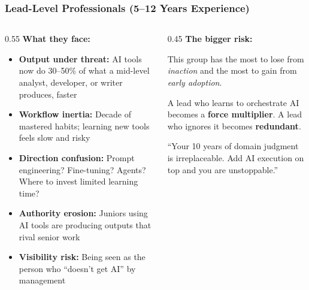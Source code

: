 \begin{frame}[fragile]\frametitle{Lead-Level Professionals (5--12 Years Experience)}

\begin{columns}
    \begin{column}[T]{0.55\linewidth}
\textbf{What they face:}
\begin{itemize}
\item \textbf{Output under threat:} AI tools now do 30--50\% of what a mid-level analyst, developer, or writer produces, faster
\item \textbf{Workflow inertia:} Decade of mastered habits; learning new tools feels slow and risky
\item \textbf{Direction confusion:} Prompt engineering? Fine-tuning? Agents? Where to invest limited learning time?
\item \textbf{Authority erosion:} Juniors using AI tools are producing outputs that rival senior work
\item \textbf{Visibility risk:} Being seen as the person who ``doesn't get AI'' by management
\end{itemize}
    \end{column}
    \begin{column}[T]{0.45\linewidth}
\textbf{The bigger risk:}

This group has the most to lose from \textit{inaction} and the most to gain from \textit{early adoption}.

\vspace{0.3cm}
A lead who learns to orchestrate AI becomes a \textbf{force multiplier}. A lead who ignores it becomes \textbf{redundant}.

\vspace{0.3cm}
{\small ``Your 10 years of domain judgment is irreplaceable. Add AI execution on top and you are unstoppable.''}
    \end{column}
\end{columns}

\end{frame}


